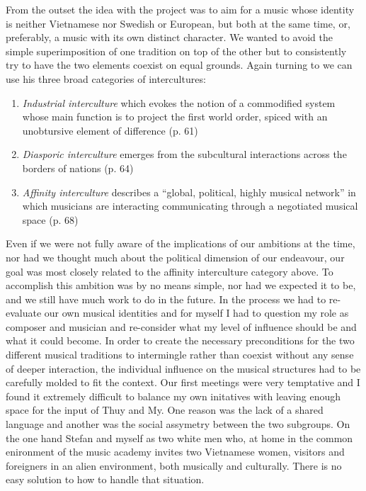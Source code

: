 \documentclass[a4paper]{article}
\begin{document}
From the outset the idea with the project was to aim for a music whose identity is neither Vietnamese nor Swedish or European, but both at the same time, or, preferably, a music with its own distinct character. We wanted to avoid the simple superimposition of one tradition on top of the other but to consistently try to have the two elements coexist on equal grounds. Again turning to \citet{slobin1987} we can use his three broad categories of intercultures:
\begin{enumerate}
\item \emph{Industrial interculture} which evokes the notion of a commodified system whose main function is to project the first world order, spiced with an unobtursive element of difference (p. 61)
\item \emph{Diasporic interculture} emerges from the subcultural interactions across the borders of nations (p. 64)
\item \emph{Affinity interculture} describes a ``global, political, highly musical network'' in which musicians are interacting communicating through a negotiated musical space (p. 68)
\end{enumerate}
Even if we were not fully aware of the implications of our ambitions at the time, nor had we thought much about the political dimension of our endeavour, our goal was most closely related to the affinity interculture category above. To accomplish this ambition was by no means simple, nor had we expected it to be, and we still have much work to do in the future. In the process we had to re-evaluate our own musical identities and for myself I had to question my role as composer and musician and re-consider what my level of influence should be and what it could become. In order to create the necessary preconditions for the two different musical traditions to intermingle rather than coexist without any sense of deeper interaction, the individual influence on the musical structures had to be carefully molded to fit the context. Our first meetings were very temptative and I found it extremely difficult to balance my own initatives with leaving enough space for the input of Thuy and My. One reason was the lack of a shared language and another was the social assymetry between the two subgroups. On the one hand Stefan and myself as two white men who, at home in the common enironment of the music academy invites two Vietnamese women, visitors and foreigners in an alien environment, both musically and culturally. There is no easy solution to how to handle that situation.
\end{document}
